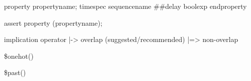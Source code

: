 property propertyname;
timespec sequencename \#\#delay boolexp
endproperty

assert property (propertyname);



implication operator
|-> overlap (suggested/recommended)
|=> non-overlap


\$onehot()

\$past()

